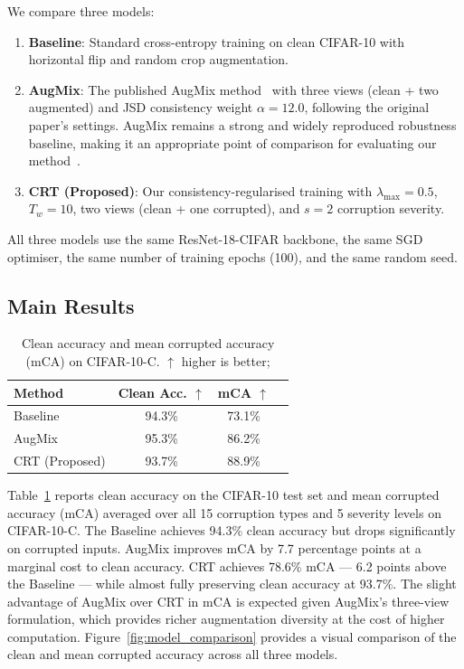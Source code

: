 \documentclass[10pt,twocolumn]{article}
\begin{document}
We compare three models:
\begin{enumerate}[leftmargin=*, topsep=2pt, itemsep=1pt]
  \item \textbf{Baseline}: Standard cross-entropy training on clean CIFAR-10 with horizontal flip and random crop augmentation.
  \item \textbf{AugMix}: The published AugMix method~\cite{hendrycks2020augmix} with three views (clean + two augmented) and JSD consistency weight $\alpha = 12.0$, following the original paper's settings. AugMix remains a strong and widely reproduced robustness baseline, making it an appropriate point of comparison for evaluating our method~\cite{erichson2024noisymix,khazem2026macs}.
  \item \textbf{CRT (Proposed)}: Our consistency-regularised training with $\lambda_{\max} = 0.5$, $T_w = 10$, two views (clean + one corrupted), and $s = 2$ corruption severity.
\end{enumerate}

All three models use the same ResNet-18-CIFAR backbone, the same SGD optimiser, the same number of training epochs (100), and the same random seed.

\subsection{Main Results}

\begin{table}[t]
\centering
\caption{Clean accuracy and mean corrupted accuracy (mCA) on CIFAR-10-C.  $\uparrow$ higher is better; }
\label{tab:main_results}
\begin{tabular}{lccc}
\toprule
\textbf{Method} & \textbf{Clean Acc.} $\uparrow$ & \textbf{mCA} $\uparrow$   \\
\midrule
Baseline        & 94.3\%       & 73.1\% \\
AugMix          & 95.3\%       & 86.2\% \\
CRT (Proposed)  & 93.7\%       & 88.9\% \\
\bottomrule
\end{tabular}
\end{table}

Table~\ref{tab:main_results} reports clean accuracy on the CIFAR-10 test set and mean corrupted accuracy (mCA) averaged over all 15 corruption types and 5 severity levels on CIFAR-10-C. The Baseline achieves 94.3\% clean accuracy but drops significantly on corrupted inputs. AugMix improves mCA by 7.7 percentage points at a marginal cost to clean accuracy. CRT achieves 78.6\% mCA --- 6.2 points above the Baseline --- while almost fully preserving clean accuracy at 93.7\%. The slight advantage of AugMix over CRT in mCA is expected given AugMix's three-view formulation, which provides richer augmentation diversity at the cost of higher computation. Figure~\ref{fig:model_comparison} provides a visual comparison of the clean and mean corrupted accuracy across all three models.
\end{document}
